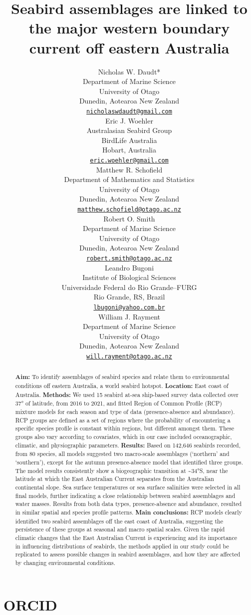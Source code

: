 \documentclass{article}
\title{Seabird assemblages are linked to the major western boundary current off eastern Australia}
\author{
    Nicholas W. Daudt*
   \\
    Department of Marine Science \\
    University of Otago \\
  Dunedin, Aotearoa New Zealand \\
  \texttt{\href{mailto:nicholaswdaudt@gmail.com}{\nolinkurl{nicholaswdaudt@gmail.com}}} \\
   \And
    Eric J. Woehler
   \\
    Australasian Seabird Group \\
    BirdLife Australia \\
  Hobart, Australia \\
  \texttt{\href{mailto:eric.woehler@gmail.com}{\nolinkurl{eric.woehler@gmail.com}}} \\
   \And
    Matthew R. Schofield
   \\
    Department of Mathematics and Statistics \\
    University of Otago \\
  Dunedin, Aotearoa New Zealand \\
  \texttt{\href{mailto:matthew.schofield@otago.ac.nz}{\nolinkurl{matthew.schofield@otago.ac.nz}}} \\
   \And
    Robert O. Smith
   \\
    Department of Marine Science \\
    University of Otago \\
  Dunedin, Aotearoa New Zealand \\
  \texttt{\href{mailto:robert.smith@otago.ac.nz}{\nolinkurl{robert.smith@otago.ac.nz}}} \\
   \And
    Leandro Bugoni
   \\
    Institute of Biological Sciences \\
    Universidade Federal do Rio Grande--FURG \\
  Rio Grande, RS, Brazil \\
  \texttt{\href{mailto:lbugoni@yahoo.com.br}{\nolinkurl{lbugoni@yahoo.com.br}}} \\
   \And
    William J. Rayment
   \\
    Department of Marine Science \\
    University of Otago \\
  Dunedin, Aotearoa New Zealand \\
  \texttt{\href{mailto:will.rayment@otago.ac.nz}{\nolinkurl{will.rayment@otago.ac.nz}}} \\
  }
\begin{document}
\maketitle


\begin{abstract}
\textbf{Aim:} To identify assemblages of seabird species and relate them to environmental conditions off eastern Australia, a world seabird hotspot.
\textbf{Location:} East coast of Australia.
\textbf{Methods:} We used 15 seabird at-sea ship-based survey data collected over 37° of latitude, from 2016 to 2021, and fitted Region of Common Profile (RCP) mixture models for each season and type of data (presence-absence and abundance). RCP groups are defined as a set of regions where the probability of encountering a specific species profile is constant within regions, but different amongst them. These groups also vary according to covariates, which in our case included oceanographic, climatic, and physiographic parameters.
\textbf{Results:} Based on 142,646 seabirds recorded, from 80 species, all models suggested two macro-scale assemblages (`northern' and `southern'), except for the autumn presence-absence model that identified three groups. The model results consistently show a biogeographic transition at \textasciitilde34°S, near the latitude at which the East Australian Current separates from the Australian continental slope. Sea surface temperatures or sea surface salinities were selected in all final models, further indicating a close relationship between seabird assemblages and water masses. Results from both data types, presence-absence and abundance, resulted in similar spatial and species profile patterns.
\textbf{Main conclusions:} RCP models clearly identified two seabird assemblages off the east coast of Australia, suggesting the persistence of these groups at seasonal and macro spatial scales. Given the rapid climatic changes that the East Australian Current is experiencing and its importance in influencing distributions of seabirds, the methods applied in our study could be replicated to assess possible changes in seabird assemblages, and how they are affected by changing environmental conditions.
\end{abstract}


\hypertarget{orcid}{%
\section*{ORCID}\label{orcid}}
\end{document}
